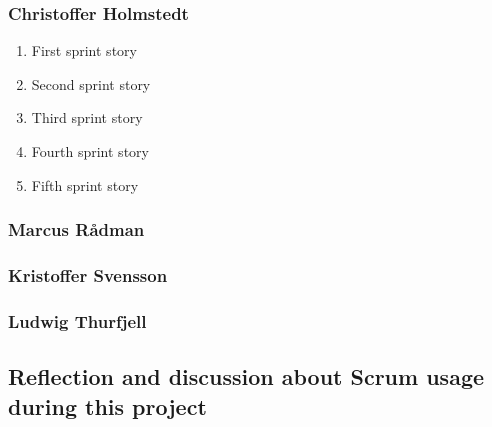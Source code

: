 \subsubsection{Christoffer Holmstedt}
\begin{enumerate}
\item First sprint story
\item Second sprint story
\item Third sprint story
\item Fourth sprint story
\item Fifth sprint story
\end{enumerate}
\subsubsection{Marcus Rådman}
\subsubsection{Kristoffer Svensson}
\subsubsection{Ludwig Thurfjell}
\subsection{Reflection and discussion about Scrum usage during this project}
